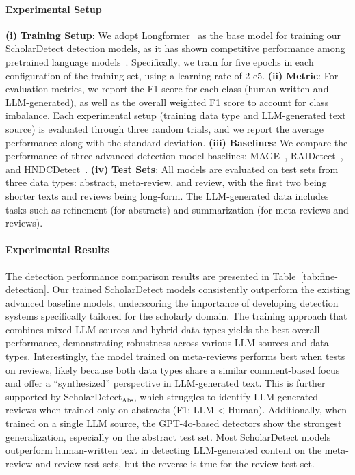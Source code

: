 \paragraph{Experimental Setup}
\textbf{(i)} \textbf{Training Setup}: 
We adopt Longformer~\cite{Beltagy2020Longformer} as the base model for training our ScholarDetect detection models, as it has shown competitive performance among pretrained language models~\cite{li-etal-2024-mage, cheng2024beyond}. Specifically, we train for five epochs in each configuration of the training set, using a learning rate of 2-e5.
\textbf{(ii)} \textbf{Metric}: 
For evaluation metrics, we report the F1 score for each class (human-written and LLM-generated), as well as the overall weighted F1 score to account for class imbalance. 
Each experimental setup (training data type and LLM-generated text source) is evaluated through three random trials, and we report the average performance along with the standard deviation. 
\textbf{(iii)} \textbf{Baselines}:
We compare the performance of three advanced detection model baselines: MAGE~\cite{li-etal-2024-mage}, RAIDetect~\cite{dugan-etal-2024-raid}, and HNDCDetect~\cite{cheng2024beyond}.
\textbf{(iv)} \textbf{Test Sets}:
All models are evaluated on test sets from three data types: abstract, meta-review, and review, with the first two being shorter texts and reviews being long-form. 
The LLM-generated data includes tasks such as refinement (for abstracts) and summarization (for meta-reviews and reviews).

\paragraph{Experimental Results}
The detection performance comparison results are presented in Table~\ref{tab:fine-detection}. Our trained ScholarDetect models consistently outperform the existing advanced baseline models, underscoring the importance of developing detection systems specifically tailored for the scholarly domain.
The training approach that combines mixed LLM sources and hybrid data types yields the best overall performance, demonstrating robustness across various LLM sources and data types.
Interestingly, the model trained on meta-reviews performs best when tests on reviews, likely because both data types share a similar comment-based focus and offer a ``synthesized'' perspective in LLM-generated text. 
This is further supported by ScholarDetect$_\text{Abs}$, which struggles to identify LLM-generated reviews when trained only on abstracts (F1: LLM < Human).
Additionally, when trained on a single LLM source, the GPT-4o-based detectors show the strongest generalization, especially on the abstract test set. 
Most ScholarDetect models outperform human-written text in detecting LLM-generated content on the meta-review and review test sets, but the reverse is true for the review test set.



